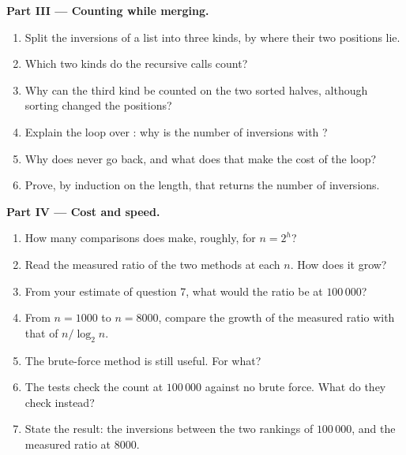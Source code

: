 \begin{problem}
\medskip\noindent\textbf{Part III --- Counting while merging.}
\begin{enumerate}[resume]
  \item Split the inversions of a list into three kinds, by where their two positions lie.
  \item Which two kinds do the recursive calls count?
  \item Why can the third kind be counted on the two sorted halves, although sorting changed the positions?
  \item Explain the loop over : why is  the number of inversions with ?
  \item Why does  never go back, and what does that make the cost of the loop?
  \item Prove, by induction on the length, that  returns the number of inversions.
\end{enumerate}

\medskip\noindent\textbf{Part IV --- Cost and speed.}
\begin{enumerate}[resume]
  \item How many comparisons does  make, roughly, for $n = 2^h$?
  \item Read the measured ratio of the two methods at each $n$. How does it grow?
  \item From your estimate of question 7, what would the ratio be at $100\,000$?
  \item From $n = 1000$ to $n = 8000$, compare the growth of the measured ratio with that of $n / \log_2 n$.
  \item The brute-force method is still useful. For what?
  \item The tests check the count at $100\,000$ against no brute force. What do they check instead?
  \item State the result: the inversions between the two rankings of $100\,000$, and the measured ratio at $8000$.
\end{enumerate}
\end{problem}
